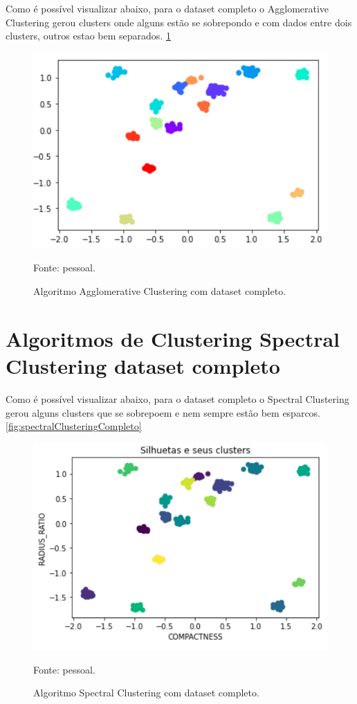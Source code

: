 Como é possível visualizar abaixo, para o dataset completo o Agglomerative Clustering gerou clusters onde alguns estão se sobrepondo e com dados entre dois clusters, outros estao bem separados. \ref{fig:dim128_agglomerative_completo}

\begin{figure}[h]
	\centering
	\includegraphics[width=0.7\linewidth]{images/dim128_agglomerative_completo}
	\caption{Algoritmo Agglomerative Clustering com dataset completo.}
	Fonte: pessoal.
	\label{fig:dim128_agglomerative_completo}
\end{figure}


\section{Algoritmos de Clustering Spectral Clustering dataset completo}

Como é possível visualizar abaixo, para o dataset completo o Spectral Clustering gerou alguns clusters que se sobrepoem e nem sempre estão bem esparcos. \ref{fig:spectralClusteringCompleto}

\begin{figure}[h]
	\centering
	\includegraphics[width=0.7\linewidth]{images/dim128_spectral_completo}
	\caption{Algoritmo Spectral Clustering com dataset completo.}
	Fonte: pessoal.
	\label{fig:dim128_spectral_completo}
\end{figure}

